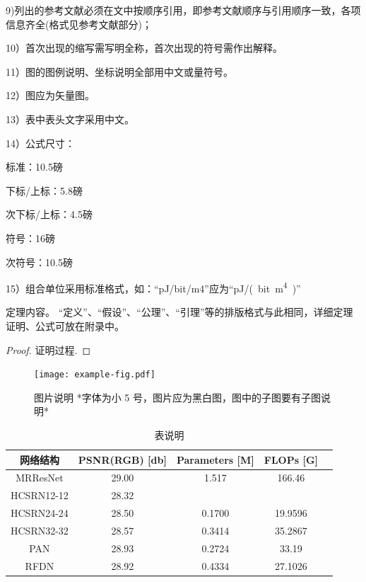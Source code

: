 \documentclass{cjc}
\begin{document}
9)列出的参考文献必须在文中按顺序引用，即参考文献顺序与引用顺序一致，各项信息齐全(格式见参考文献部分)；

10）首次出现的缩写需写明全称，首次出现的符号需作出解释。

11）图的图例说明、坐标说明全部用中文或量符号。

12）图应为矢量图。

13）表中表头文字采用中文。

14）公式尺寸：

标准：10.5磅

下标/上标：5.8磅

次下标/上标：4.5磅

符号：16磅

次符号：10.5磅

15）组合单位采用标准格式，如：“pJ/bit/m4”应为“\si{pJ/(bit.m^4)}”


\begin{theorem}
  定理内容。
  “定义”、“假设”、“公理”、“引理”等的排版格式与此相同，详细定理证明、公式可放在附录中。
\end{theorem}

\begin{proof}
  证明过程.
\end{proof}

\begin{figure}[htb]
  \centering
  \texttt{[image: example-fig.pdf]}
  \caption{图片说明 *字体为小 5 号，图片应为黑白图，图中的子图要有子图说明*}
\end{figure}

\begin{table}[htb]
  \centering
  \caption{表说明}
  \small
  \begin{tabular}{c|cccc}
    \toprule
    网络结构 & PSNR(RGB) [db]& Parameters [M] & FLOPs [G]\\
    \midrule
    MRResNet & 29.00  & 1.517 & 166.46\\
    \midrule
    HCSRN12-12    & 28.32 & \\
    \midrule
    HCSRN24-24    & 28.50 & 0.1700 & 19.9596 \\
    \midrule
    HCSRN32-32    & 28.57 & 0.3414 & 35.2867 \\
    \midrule
    PAN           & 28.93 & 0.2724 & 33.19 \\
    \midrule
    RFDN          & 28.92 & 0.4334 & 27.1026 \\
    \bottomrule
  \end{tabular}
\end{table}
\end{document}
